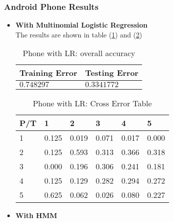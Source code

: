 \subsubsection{Android Phone Results} 
\label{subsec:phoneresult}
\begin{itemize}
\item \textbf{With Multinomial Logistic Regression} \\
The results are shown in table (\ref{tab:phoneLR1}) and (\ref{tab:phoneLR2})
\begin{table}
\begin{center}
\begin{tabular}{|l|l|}
      \hline
      Training Error & Testing Error\\
      \hline
      $0.748297$ & $0.3341772$ \\
      \hline
\end{tabular}
\caption{Phone with LR: overall accuracy}
\label{tab:phoneLR1}
\end{center}
\end{table}

\begin{table}
\begin{center}
\begin{tabular}{|l|l|l|l|l|l|}
      \hline
      P/T& 1 & 2 &3 & 4 & 5 \\
      \hline
      1 &0.125&0.019&0.071&0.017&0.000\\
      2 &0.125&0.593&0.313&0.366&0.318\\
      3 &0.000&0.196&0.306&0.241&0.181\\
      4 &0.125&0.129&0.282&0.294&0.272\\
      5 & 0.625&0.062&0.026&0.080&0.227\\
      \hline
\end{tabular}
\caption{Phone with LR: Cross Error Table}
\label{tab:phoneLR2}
\end{center}
\end{table}

\item \textbf{With HMM}


\end{itemize}
